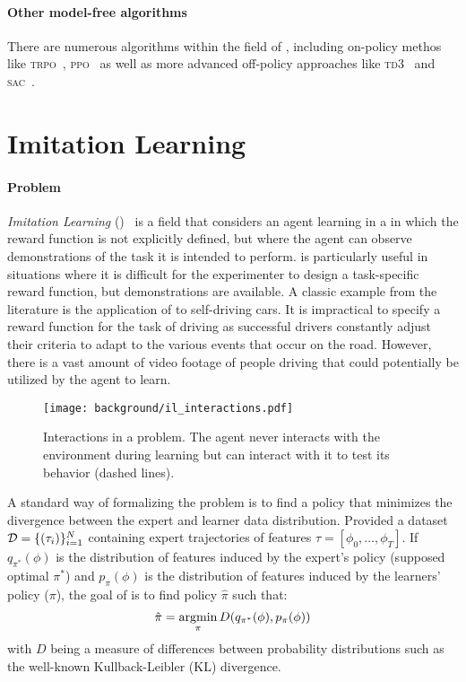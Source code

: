 \paragraph{Other model-free \rl algorithms}

There are numerous algorithms within the field of \drl, including on-policy methos like \textsc{trpo}~\citep{pmlr-v37-schulman15}, \textsc{ppo}~\citep{ppo2017} as well as more advanced off-policy approaches like \textsc{td3}~\citep{pmlr-v80-fujimoto18a} and \textsc{sac}~\citep{pmlr-v80-haarnoja18b}.


\section{Imitation Learning}

\label{sec:background_il}
\paragraph{Problem}

\textit{Imitation Learning} (\il)~\citep{pommerleau1988BC,schaal1996learning,osa2018algorithmic} is a field that considers an agent learning in a \mdp in which the reward function is not explicitly defined, but where the agent can observe demonstrations of the task it is intended to perform. \il is particularly useful in situations where it is difficult for the experimenter to design a task-specific reward function, but demonstrations are available. A classic example from the literature is the application of \il to self-driving cars. It is impractical to specify a reward function for the task of driving as successful drivers constantly adjust their criteria to adapt to the various events that occur on the road. However, there is a vast amount of video footage of people driving that could potentially be utilized by the agent to learn.

\begin{figure}[!h]
\centering
\texttt{[image: background/il\_interactions.pdf]}	
\caption{Interactions in a \il problem. The agent never interacts with the environment during learning but can interact with it to test its behavior (dashed lines).}
\label{fig:il_interacvtions}
\end{figure}

A standard way of formalizing the \il problem is to find a policy that minimizes the divergence between the expert and learner data distribution. Provided a dataset $\mathcal{D}=\{(\tau_i)\}_{i=1}^N$ containing expert trajectories of features $\tau = [\phi_0,\dots, \phi_T]$. If $q_{\pi^*}(\phi)$ is the distribution of features induced by the expert's policy (supposed optimal $\pi^*$) and $p_\pi(\phi)$ is the distribution of features induced by the learners' policy ($\pi$), the goal of \il is to find policy $\hat{\pi}$ such that:
\begin{equation}
\hat{\pi} = \operatorname*{argmin}_{\pi}D(q_{\pi^*}(\phi),p_\pi(\phi))
\end{equation}
with $D$ being a measure of differences between probability distributions such as the well-known Kullback-Leibler (KL) divergence.

